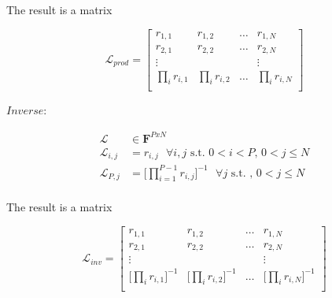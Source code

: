 \documentclass[conference]{IEEEtran}
\begin{document}
\begin{flushleft}
The result is a matrix \\
\end{flushleft}

\begin{equation*}
\mathcal{L}_{prod} = 
\begin{bmatrix}
r_{1,1} & r_{1,2} & \dots & r_{1,N}\\
r_{2,1} & r_{2,2} & \dots & r_{2,N} \\
\vdots &  &  & \vdots\\
\prod_{i}r_{i,1} & \prod_{i}r_{i,2} & \dots & \prod_{i}r_{i,N}\\
\end{bmatrix}
\end{equation*}
\hfill\break

\begin{flushleft}
$Inverse$:\\
\end{flushleft}
\begin{equation*}
\begin{split}
\mathcal{L} &\in \textbf{F}^{PxN}\\
\mathcal{L}_{i,j} &= \textit{r}_{i,j} \text{ } \forall i, j \text{ s.t. } 0 < i < P \text{, } 0 < j \leq N\\
\mathcal{L}_{P,j} &= \Bigg[\prod_{i = 1}^{P - 1} r_{i,j}\Bigg]^{-1} \text{ } \forall j \text{ s.t. }\text{, }0 < j \leq N\\
\end{split}
\end{equation*}

\begin{flushleft}
The result is a matrix \\
\end{flushleft}
\begin{equation*}
\mathcal{L}_{inv} = 
\begin{bmatrix}
r_{1,1} & r_{1,2} & \dots & r_{1,N}\\
r_{2,1} & r_{2,2} & \dots & r_{2,N} \\
\vdots &  &  & \vdots\\
\big[\prod_{i}r_{i,1}\big]^{-1} & \big[\prod_{i}r_{i,2}\big]^{-1} & \dots & \big[\prod_{i}r_{i,N}\big]^{-1}\\
\end{bmatrix}
\end{equation*}
\hfill\break
\end{document}
